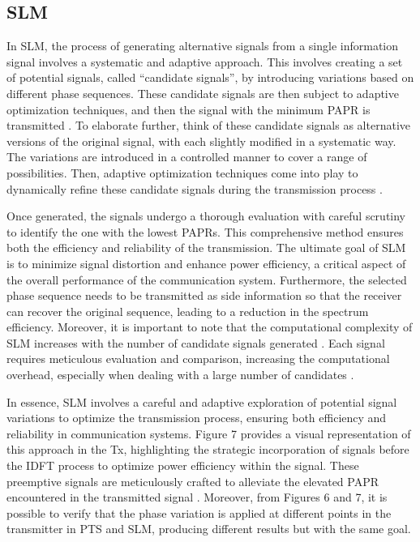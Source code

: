\documentclass[conference]{IEEEtran}
\begin{document}
\subsection{SLM}
In SLM, the process of generating alternative signals from a single information signal involves a systematic and adaptive approach. This involves creating a set of potential signals, called ``candidate signals'', by introducing variations based on different phase sequences. These candidate signals are then subject to adaptive optimization techniques, and then the signal with the minimum PAPR is transmitted \cite{b92}. To elaborate further, think of these candidate signals as alternative versions of the original signal, with each slightly modified in a systematic way. The variations are introduced in a controlled manner to cover a range of possibilities. Then, adaptive optimization techniques come into play to dynamically refine these candidate signals during the transmission process \cite{b93, b94}.

Once generated, the signals undergo a thorough evaluation with careful scrutiny to identify the one with the lowest PAPRs. This comprehensive method ensures both the efficiency and reliability of the transmission. The ultimate goal of SLM is to minimize signal distortion and enhance power efficiency, a critical aspect of the overall performance of the communication system. Furthermore, the selected phase sequence needs to be transmitted as side information so that the receiver can recover the original sequence, leading to a reduction in the spectrum efficiency. Moreover, it is important to note that the computational complexity of SLM increases with the number of candidate signals generated \cite{b94, b95}. Each signal requires meticulous evaluation and comparison, increasing the computational overhead, especially when dealing with a large number of candidates \cite{b96}.

In essence, SLM involves a careful and adaptive exploration of potential signal variations to optimize the transmission process, ensuring both efficiency and reliability in communication systems. Figure 7 provides a visual representation of this approach in the Tx, highlighting the strategic incorporation of signals before the IDFT process to optimize power efficiency within the signal. These preemptive signals are meticulously crafted to alleviate the elevated PAPR encountered in the transmitted signal \cite{b94, b97, b98}. Moreover, from Figures 6 and 7, it is possible to verify that the phase variation is applied at different points in the transmitter in PTS and SLM, producing different results but with the same goal.
\end{document}
